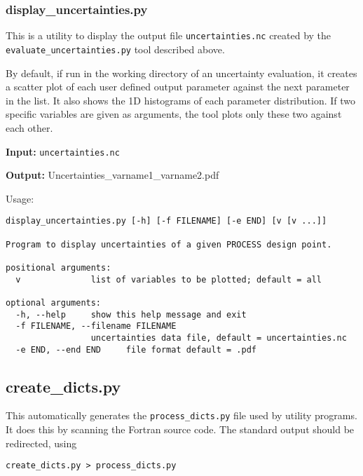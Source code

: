 \subsubsection{display\_uncertainties.py}

This is a utility to display the output file \texttt{uncertainties.nc} created by the \texttt{evaluate\_uncertainties.py} tool described above.

By default, if run in the working directory of an uncertainty evaluation, it creates a scatter plot of each user defined output parameter against the next parameter in the list.  It also shows the 1D histograms of each parameter distribution. If two specific variables are given as arguments, the tool plots only these two against each other.

\begin{description}
\item{\textbf{Input:}}
 \texttt{uncertainties.nc}
                                
\item{\textbf{Output:}}
Uncertainties\_varname1\_varname2.pdf
\end{description}

Usage:
\begin{verbatim}
display_uncertainties.py [-h] [-f FILENAME] [-e END] [v [v ...]]

Program to display uncertainties of a given PROCESS design point.

positional arguments:
  v              list of variables to be plotted; default = all

optional arguments:
  -h, --help     show this help message and exit
  -f FILENAME, --filename FILENAME
                 uncertainties data file, default = uncertainties.nc
  -e END, --end END     file format default = .pdf
\end{verbatim}

\subsection{create\_dicts.py}

This automatically generates the \texttt{process\_dicts.py} file used by \process utility programs.  It does this by scanning the Fortran source code.  The standard output should be redirected, using\\
\begin{verbatim}
create_dicts.py > process_dicts.py
\end{verbatim}



